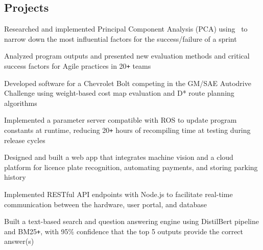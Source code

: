 \documentclass{mxresume}
\begin{document}
\begin{minipage}[t]{0.73\textwidth}
\begin{resumebody}
\begin{large}
\section*{Projects}
%
\begin{tightemize}{5mm}
\item Researched and implemented Principal Component Analysis (PCA) using \Csharp\ to narrow down the most influential factors for the success/failure of a sprint
\item Analyzed program outputs and presented new evaluation methods and critical success factors for Agile practices in 20\texttt{+} teams
\end{tightemize}
%
%
\begin{tightemize}{5mm}
\item Developed software for a Chevrolet Bolt competing in the GM/SAE Autodrive Challenge using weight-based cost map evaluation and D* route planning algorithms
\item Implemented a parameter server compatible with ROS to update program constants at runtime, reducing 20\texttt{+} hours of recompiling time at testing during release cycles
\end{tightemize}
%
%
\begin{tightemize}{5mm}
\item Designed and built a web app that integrates machine vision and a cloud platform for licence plate recognition, automating payments, and storing parking history
\item Implemented RESTful API endpoints with Node.js to facilitate real-time communication between the hardware, user portal, and database
\end{tightemize}
%
%
\begin{tightemize}{5mm}
\item Built a text-based search and question answering engine using DistilBert pipeline and BM25\texttt{+}, with 95\textsc{\%} confidence that the top 5 outputs provide the correct answer(s)
\end{tightemize}
\end{large}
\end{resumebody}
\end{minipage}
\hfill
\end{document}
